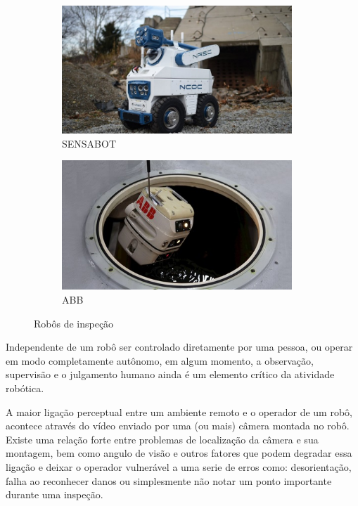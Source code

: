 \begin{figure}[H]
	\centering
	\begin{subfigure}{.5\textwidth}
		\includegraphics[width=0.95\textwidth]{figuras/sensabot.jpg}
		\caption{SENSABOT}
		\label{fig:sensabot}
	\end{subfigure}%
	\begin{subfigure}{.5\textwidth}
		\includegraphics[width=0.95\textwidth]{figuras/abb.jpg}
		\caption{ABB}
		\label{fig:abb}
	\end{subfigure}
	\caption{Robôs de inspeção}
\end{figure}

Independente de um robô ser controlado diretamente por uma pessoa, ou operar em modo completamente autônomo, em algum momento, a observação, supervisão e o julgamento humano ainda é um elemento crítico da atividade robótica.\par

A maior ligação perceptual entre um ambiente remoto e o operador de um robô, acontece através do vídeo enviado por uma (ou mais) câmera montada no robô. Existe uma relação forte entre problemas de localização da câmera e sua montagem, bem como angulo de visão e outros fatores que podem degradar essa ligação e deixar o operador vulnerável a uma serie de erros como: desorientação, falha ao reconhecer danos ou simplesmente não notar um ponto importante durante uma inspeção.\par

